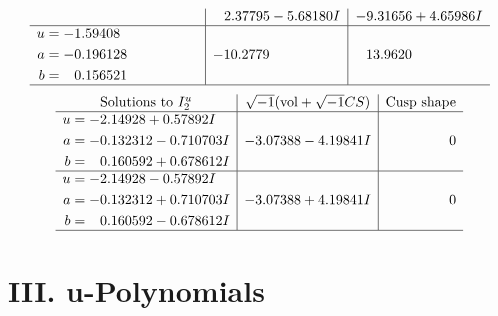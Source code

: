\documentclass[1p]{elsarticle_modified}
\theoremstyle{definition}
\newcommand{\I}{\sqrt{-1}}
\begin{document}
$$\begin{array}{c|c|c}
 & \phantom{-}2.37795 - 5.68180 I & -9.31656 + 4.65986 I \\ \hline\begin{aligned}
u &= -1.59408\phantom{ +0.000000I} \\
a &= -0.196128\phantom{ +0.000000I} \\
b &= \phantom{-}0.156521\phantom{ +0.000000I}\end{aligned}
 & -10.2779\phantom{ +0.000000I} & \phantom{-}13.9620\phantom{ +0.000000I}\\
 \hline 
 \end{array}$$\newpage$$\begin{array}{c|c|c}  
\text{Solutions to }I^u_{2}& \I (\text{vol} + \sqrt{-1}CS) & \text{Cusp shape}\\
 \hline 
\begin{aligned}
u &= -2.14928 + 0.57892 I \\
a &= -0.132312 - 0.710703 I \\
b &= \phantom{-}0.160592 + 0.678612 I\end{aligned}
 & -3.07388 - 4.19841 I & \phantom{-0.000000 } 0 \\ \hline\begin{aligned}
u &= -2.14928 - 0.57892 I \\
a &= -0.132312 + 0.710703 I \\
b &= \phantom{-}0.160592 - 0.678612 I\end{aligned}
 & -3.07388 + 4.19841 I & \phantom{-0.000000 } 0\\
 \hline 
 \end{array}$$\newpage
\newpage\renewcommand{\arraystretch}{1}
\centering \section*{ III. u-Polynomials}
\end{document}
